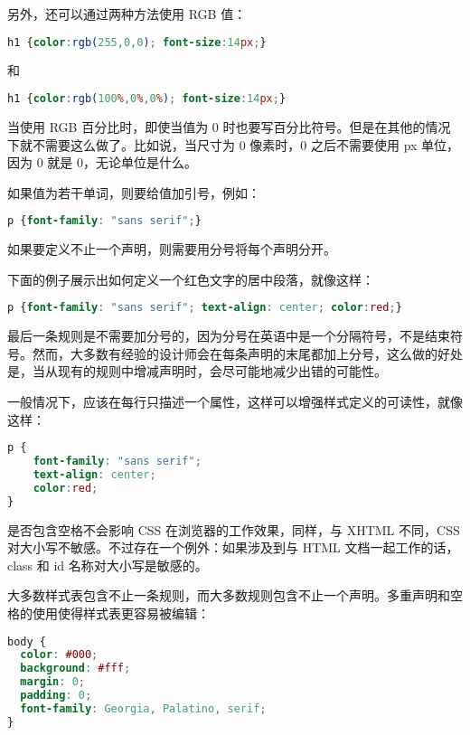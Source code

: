 另外，还可以通过两种方法使用 RGB 值：

\begin{lstlisting}[language=CSS]
h1 {color:rgb(255,0,0); font-size:14px;}
\end{lstlisting}

和

\begin{lstlisting}[language=CSS]
h1 {color:rgb(100%,0%,0%); font-size:14px;}
\end{lstlisting}

当使用 RGB 百分比时，即使当值为 0 时也要写百分比符号。但是在其他的情况下就不需要这么做了。比如说，当尺寸为 0 像素时，0 之后不需要使用 px 单位，因为 0 就是 0，无论单位是什么。

如果值为若干单词，则要给值加引号，例如：

\begin{lstlisting}[language=CSS]
p {font-family: "sans serif";}
\end{lstlisting}

如果要定义不止一个声明，则需要用分号将每个声明分开。

下面的例子展示出如何定义一个红色文字的居中段落，就像这样：

\begin{lstlisting}[language=CSS]
p {font-family: "sans serif"; text-align: center; color:red;}
\end{lstlisting}

最后一条规则是不需要加分号的，因为分号在英语中是一个分隔符号，不是结束符号。然而，大多数有经验的设计师会在每条声明的末尾都加上分号，这么做的好处是，当从现有的规则中增减声明时，会尽可能地减少出错的可能性。

一般情况下，应该在每行只描述一个属性，这样可以增强样式定义的可读性，就像这样：

\begin{lstlisting}[language=CSS]
p {
	font-family: "sans serif"; 
	text-align: center; 
	color:red; 
}
\end{lstlisting}

是否包含空格不会影响 CSS 在浏览器的工作效果，同样，与 XHTML 不同，CSS 对大小写不敏感。不过存在一个例外：如果涉及到与 HTML 文档一起工作的话，class 和 id 名称对大小写是敏感的。

大多数样式表包含不止一条规则，而大多数规则包含不止一个声明。多重声明和空格的使用使得样式表更容易被编辑：

\begin{lstlisting}[language=CSS]
body {
  color: #000;
  background: #fff;
  margin: 0;
  padding: 0;
  font-family: Georgia, Palatino, serif;
}
\end{lstlisting}



